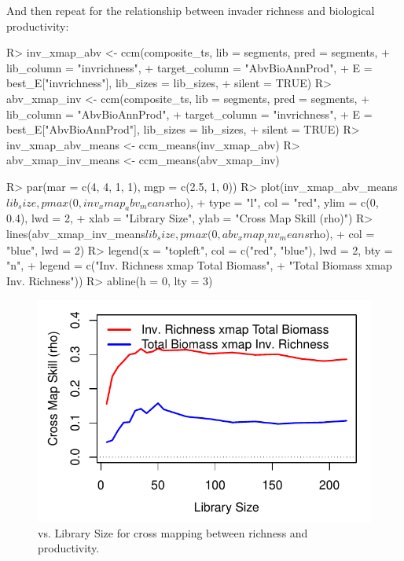 \documentclass[article]{jss}
\begin{document}
And then repeat for the relationship between invader richness and biological productivity:
\begin{Schunk}
\begin{Sinput}
R> inv_xmap_abv <- ccm(composite_ts, lib = segments, pred = segments, 
+                      lib_column = "invrichness", 
+                      target_column = "AbvBioAnnProd", 
+                      E = best_E["invrichness"], lib_sizes = lib_sizes, 
+                      silent = TRUE)
R> abv_xmap_inv <- ccm(composite_ts, lib = segments, pred = segments, 
+                      lib_column = "AbvBioAnnProd", 
+                      target_column = "invrichness", 
+                      E = best_E["AbvBioAnnProd"], lib_sizes = lib_sizes, 
+                      silent = TRUE)
R> inv_xmap_abv_means <- ccm_means(inv_xmap_abv)
R> abv_xmap_inv_means <- ccm_means(abv_xmap_inv)
\end{Sinput}
\end{Schunk}

\begin{Schunk}
\begin{Sinput}
R> par(mar = c(4, 4, 1, 1), mgp = c(2.5, 1, 0))
R> plot(inv_xmap_abv_means$lib_size, pmax(0, inv_xmap_abv_means$rho), 
+       type = "l", col = "red", ylim = c(0, 0.4), lwd = 2, 
+       xlab = "Library Size", ylab = "Cross Map Skill (rho)")
R> lines(abv_xmap_inv_means$lib_size, pmax(0, abv_xmap_inv_means$rho),
+        col = "blue", lwd = 2)
R> legend(x = "topleft", col = c("red", "blue"), lwd = 2, bty = "n", 
+         legend = c("Inv. Richness xmap Total Biomass", 
+                    "Total Biomass xmap Inv. Richness"))
R> abline(h = 0, lty = 3)
\end{Sinput}
\end{Schunk}

\begin{figure}[t!]
\begin{center}
\includegraphics[width=4.5in]{article-ccm-e120-inv-abv}
\end{center}
\caption{\label{fig:ccm-e120-inv-abv}  vs. Library Size for cross mapping between richness and productivity.}
\end{figure}
\end{document}

